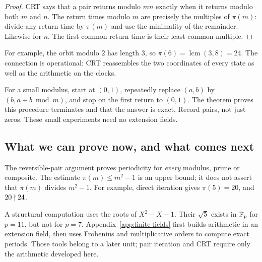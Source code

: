 \begin{proof}
CRT says that a pair returns modulo $mn$ exactly when it returns modulo
both $m$ and $n$. The return times modulo $m$ are precisely the multiples
of $\pi(m)$: divide any return time by $\pi(m)$ and use the minimality of
the remainder. Likewise for $n$. The first common return time is their
least common multiple.
\end{proof}

For example, the orbit modulo $2$ has length $3$, so
$\pi(6)=\operatorname{lcm}(3,8)=24$.
The connection is operational: CRT reassembles the two coordinates of
every state as well as the arithmetic on the clocks.

\begin{labbox}
For a small modulus, start at $(0,1)$, repeatedly replace $(a,b)$ by
$(b,a+b\bmod m)$, and stop on the first return to $(0,1)$.
The theorem proves this procedure terminates and that the answer is exact.
Record pairs, not just zeros. These small experiments need no extension fields.
\end{labbox}

\subsection*{What we can prove now, and what comes next}

The reversible-pair argument proves periodicity for \emph{every} modulus,
prime or composite. The estimate $\pi(m)\le m^2-1$ is an upper bound;
it does not assert that $\pi(m)$ divides $m^2-1$.
For example, direct iteration gives $\pi(5)=20$, and $20\nmid24$.

A structural computation uses the roots of $X^2-X-1$.
Their $\sqrt5$ exists in $\mathbb F_p$ for $p=11$, but not for $p=7$.
Appendix~\ref{app:finite-fields} first builds arithmetic in an extension
field, then uses Frobenius and multiplicative orders to compute exact
periods. Those tools belong to a later unit; pair iteration and CRT
require only the arithmetic developed here.
